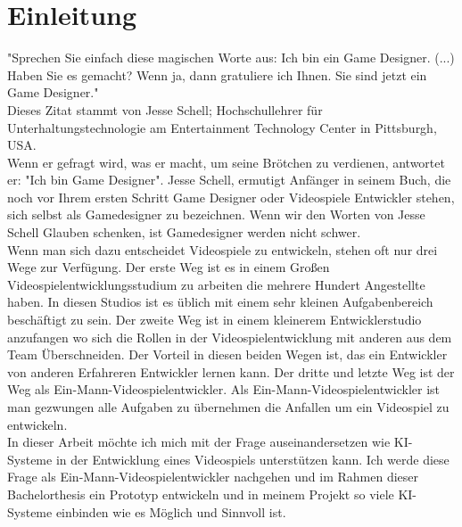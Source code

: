 \documentclass[10pt,a4paper,bibliography=totocnumbered,listof=totocnumbered]{scrartcl}
\begin{document}
\section{Einleitung}
"Sprechen Sie einfach diese magischen Worte aus: Ich bin ein Game Designer. (...) Haben Sie es gemacht? Wenn ja, dann gratuliere ich Ihnen. Sie sind jetzt ein Game Designer."\cite{schell2020kunst}
\\
Dieses Zitat stammt von Jesse Schell; Hochschullehrer für Unterhaltungstechnologie am Entertainment Technology Center in Pittsburgh, USA.
\\
Wenn er gefragt wird, was er macht, um seine Brötchen zu verdienen, antwortet er: "Ich bin Game Designer". Jesse Schell, ermutigt Anfänger in seinem Buch, die noch vor Ihrem ersten Schritt Game Designer oder Videospiele Entwickler stehen, sich selbst als Gamedesigner zu bezeichnen. Wenn wir den Worten von Jesse Schell Glauben schenken, ist Gamedesigner werden nicht schwer.
\\
Wenn man sich dazu entscheidet Videospiele zu entwickeln, stehen oft nur drei Wege zur Verfügung. Der erste Weg ist es in einem Großen Videospielentwicklungsstudium zu arbeiten die mehrere Hundert Angestellte haben. In diesen Studios ist es üblich mit einem sehr kleinen Aufgabenbereich beschäftigt zu sein. Der zweite Weg ist in einem kleinerem Entwicklerstudio anzufangen wo sich die Rollen in der Videospielentwicklung mit anderen aus dem Team Überschneiden. Der Vorteil in diesen beiden Wegen ist, das ein Entwickler von anderen Erfahreren Entwickler lernen kann. Der dritte und letzte Weg ist der Weg als Ein-Mann-Videospielentwickler. Als Ein-Mann-Videospielentwickler ist man gezwungen alle Aufgaben zu übernehmen die Anfallen um ein Videospiel zu entwickeln.
\\
In dieser Arbeit möchte ich mich mit der Frage auseinandersetzen wie KI-Systeme in der Entwicklung eines Videospiels unterstützen kann. Ich werde diese Frage als Ein-Mann-Videospielentwickler nachgehen und im Rahmen dieser Bachelorthesis ein Prototyp entwickeln und in meinem Projekt so viele KI-Systeme einbinden wie es Möglich und Sinnvoll ist.

 
\end{document}
